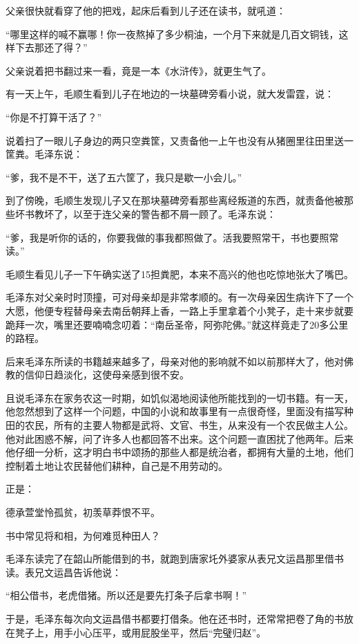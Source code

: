 \documentclass[../../dazhuan.tex]{subfiles}
\begin{document}
父亲很快就看穿了他的把戏，起床后看到儿子还在读书，就吼道：

“哪里这样的喊不赢哪！你一夜熬掉了多少桐油，一个月下来就是几百文铜钱，这样下去那还了得？”

父亲说着把书翻过来一看，竟是一本《水浒传》，就更生气了。

有一天上午，毛顺生看到儿子在地边的一块墓碑旁看小说，就大发雷霆，说：

“你是不打算干活了？”

说着扫了一眼儿子身边的两只空粪筐，又责备他一上午也没有从猪圈里往田里送一筐粪。毛泽东说：

“爹，我不是不干，送了五六筐了，我只是歇一小会儿。”

到了傍晚，毛顺生发现儿子又在那块墓碑旁看那些离经叛道的东西，就责备他被那些坏书教坏了，以至于连父亲的警告都不屑一顾了。毛泽东说：

“爹，我是听你的话的，你要我做的事我都照做了。活我要照常干，书也要照常读。”

毛顺生看见儿子一下午确实送了15担粪肥，本来不高兴的他也吃惊地张大了嘴巴。

毛泽东对父亲时时顶撞，可对母亲却是非常孝顺的。有一次母亲因生病许下了一个大愿，他便专程替母亲去南岳朝拜上香，一路上手里拿着个小凳子，走十来步就要跪拜一次，嘴里还要喃喃念叨着：“南岳圣帝，阿弥陀佛。”就这样竟走了20多公里的路程。

后来毛泽东所读的书籍越来越多了，母亲对他的影响就不如以前那样大了，他对佛教的信仰日趋淡化，这使母亲感到很不安。

且说毛泽东在家务农这一时期，如饥似渴地阅读他所能找到的一切书籍。有一天，他忽然想到了这样一个问题，中国的小说和故事里有一点很奇怪，里面没有描写种田的农民，所有的主要人物都是武将、文官、书生，从来没有一个农民做主人公。他对此困惑不解，问了许多人也都回答不出来。这个问题一直困扰了他两年。后来他仔细一分析，这才明白书中颂扬的那些人都是统治者，都拥有大量的土地，他们控制着土地让农民替他们耕种，自己是不用劳动的。

正是：\begin{xemph}德承萱堂怜孤贫，初羡草莽恨不平。

\hspace{3em}书中常见将和相，为何难觅种田人？\end{xemph}

毛泽东读完了在韶山所能借到的书，就跑到唐家圫外婆家从表兄文运昌那里借书读。表兄文运昌告诉他说：

“相公借书，老虎借猪。所以还是要先打条子后拿书啊！”

于是，毛泽东每次向文运昌借书都要打借条。他在还书时，还常常把卷了角的书放在凳子上，用手小心压平，或用屁股坐平，然后“完璧归赵”。
\end{document}

